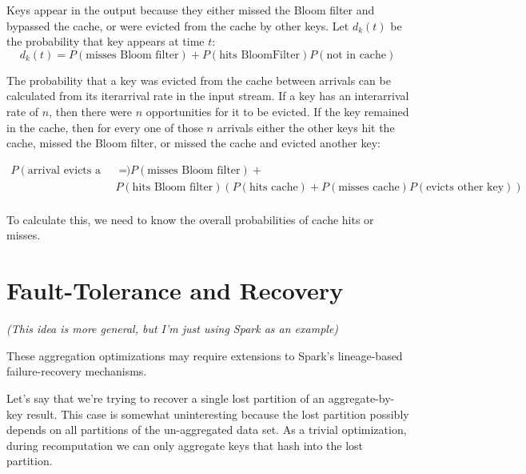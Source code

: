 \documentclass[12pt]{article}
\begin{document}



Keys appear in the output because they either missed the Bloom filter and
bypassed the cache, or were evicted from the cache by other keys.  Let
$d_k(t)$ be the probability that key appears at time $t$:
\[
    d_k(t) = P\left(\text{misses Bloom filter}\right)
                +
             P\left(\text{hits BloomFilter}\right)
             P\left(\text{not in cache}\right)
\]

The probability that a key was evicted from the cache between arrivals can be
calculated from its iterarrival rate in the input stream.  If a key has an
interarrival rate of $n$, then there were $n$ opportunities for it to be
evicted.  If the key remained in the cache, then for every one of those $n$
arrivals either the other keys hit the cache, missed the Bloom filter, or
missed the cache and evicted another key:

\begin{align*}
    P\left(\text{arrival evicts a particular key}\right)
    &=  P\left(\text{misses Bloom filter}\right) + \\
    &
    P\left(\text{hits Bloom filter}\right)
    \left(
        P\left(\text{hits cache}\right)
        + P\left(\text{misses cache}\right)P\left(\text{evicts other key}\right)
    \right)
    \\
\end{align*}

To calculate this, we need to know the overall probabilities of cache hits or
misses.




\pagebreak

\section{Fault-Tolerance and Recovery}

\emph{(This idea is more general, but I'm just using Spark as an example)}

These aggregation optimizations may require extensions to Spark's lineage-based failure-recovery mechanisms.

Let's say that we're trying to recover a single lost partition of an
aggregate-by-key result.  This case is somewhat uninteresting because the lost
partition possibly depends on all partitions of the un-aggregated data set.
As a trivial optimization, during recomputation we can only aggregate keys
that hash into the lost partition.
\end{document}
